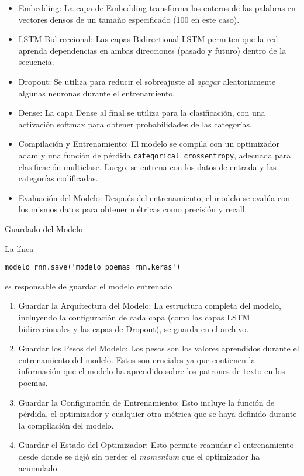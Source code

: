 \begin{itemize}
    \item Embedding: La capa de Embedding transforma los enteros de las palabras en vectores 
    densos de un tamaño especificado (100 en este caso).

    \item LSTM Bidireccional: Las capas Bidirectional LSTM permiten que la red aprenda 
    dependencias en ambas direcciones (pasado y futuro) dentro de la secuencia.

    \item Dropout: Se utiliza para reducir el sobreajuste al \textit{apagar} aleatoriamente 
    algunas neuronas durante el entrenamiento.

    \item Dense: La capa Dense al final se utiliza para la clasificación, con una activación 
    softmax para obtener probabilidades de las categorías.

    \item Compilación y Entrenamiento: El modelo se compila con un optimizador adam y una 
    función de pérdida \texttt{categorical crossentropy}, adecuada para clasificación multiclase.
    Luego, se entrena con los datos de entrada y las categorías codificadas.

    \item Evaluación del Modelo: Después del entrenamiento, el modelo se evalúa con los mismos 
    datos para obtener métricas como precisión y recall.    
\end{itemize}

\begin{center}
    Guardado del Modelo
\end{center}

La línea 
\begin{verbatim}
modelo_rnn.save('modelo_poemas_rnn.keras')    
\end{verbatim}

es responsable de guardar el modelo entrenado

\begin{enumerate}
    \item Guardar la Arquitectura del Modelo: La estructura completa del modelo, incluyendo la 
    configuración de cada capa (como las capas LSTM bidireccionales y las capas de Dropout), 
    se guarda en el archivo.

    \item Guardar los Pesos del Modelo: Los pesos son los valores aprendidos durante el 
    entrenamiento del modelo. Estos son cruciales ya que contienen la información que el modelo 
    ha aprendido sobre los patrones de texto en los poemas.

    \item Guardar la Configuración de Entrenamiento: Esto incluye la función de pérdida, el 
    optimizador y cualquier otra métrica que se haya definido durante la compilación del modelo.

    \item Guardar el Estado del Optimizador: Esto permite reanudar el entrenamiento desde donde 
    se dejó sin perder el \textit{momentum} que el optimizador ha acumulado.
\end{enumerate}

